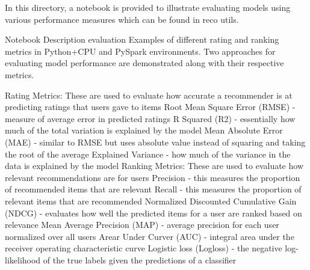 In this directory, a notebook is provided to illustrate evaluating models using various performance measures which can be found in reco utils.

Notebook	Description
evaluation	Examples of different rating and ranking metrics in Python+CPU and PySpark environments.
Two approaches for evaluating model performance are demonstrated along with their respective metrics.

Rating Metrics: These are used to evaluate how accurate a recommender is at predicting ratings that users gave to items
Root Mean Square Error (RMSE) - measure of average error in predicted ratings
R Squared (R2) - essentially how much of the total variation is explained by the model
Mean Absolute Error (MAE) - similar to RMSE but uses absolute value instead of squaring and taking the root of the average
Explained Variance - how much of the variance in the data is explained by the model
Ranking Metrics: These are used to evaluate how relevant recommendations are for users
Precision - this measures the proportion of recommended items that are relevant
Recall - this measures the proportion of relevant items that are recommended
Normalized Discounted Cumulative Gain (NDCG) - evaluates how well the predicted items for a user are ranked based on relevance
Mean Average Precision (MAP) - average precision for each user normalized over all users
Arear Under Curver (AUC) - integral area under the receiver operating characteristic curve
Logistic loss (Logloss) - the negative log-likelihood of the true labels given the predictions of a classifier

